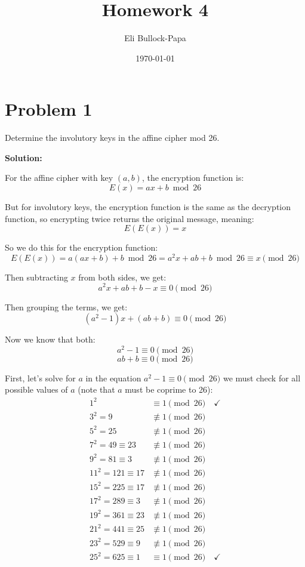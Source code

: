 \documentclass[12pt]{article}
\title{Homework 4}
\author{Eli Bullock-Papa}
\date{\today}
\begin{document}
\maketitle

\section*{Problem 1}
Determine the involutory keys in the affine cipher mod 26.

\vspace{1em}
\textbf{Solution:}

For the affine cipher with key $(a,b)$, the encryption function is:
\[E(x) = ax + b \bmod 26\]

But for involutory keys, the encryption function is the same as the decryption function, so encrypting twice returns the original message, meaning:
\[E(E(x)) = x\]

So we do this for the encryption function:
\[E(E(x)) = a(ax + b) + b \bmod 26 = a^2x + ab + b \bmod 26 \equiv x \pmod{26}\]

Then subtracting $x$ from both sides, we get:
\[a^2x + ab + b - x \equiv 0 \pmod{26}\]

Then grouping the terms, we get:
\[(a^2 - 1)x + (ab + b) \equiv 0 \pmod{26}\]

Now we know that both:
\[a^2 - 1 \equiv 0 \pmod{26}\]
\[ab + b \equiv 0 \pmod{26}\]

First, let's solve for $a$ in the equation $a^2 - 1 \equiv 0 \pmod{26}$ we must check for all possible values of $a$ (note that $a$ must be coprime to 26):
\begin{align*}
1^2 &\equiv 1 \pmod{26} \quad \checkmark\\
3^2 = 9 &\not\equiv 1 \pmod{26}\\
5^2 = 25 &\not\equiv 1 \pmod{26}\\
7^2 = 49 \equiv 23 &\not\equiv 1 \pmod{26}\\
9^2 = 81 \equiv 3 &\not\equiv 1 \pmod{26}\\
11^2 = 121 \equiv 17 &\not\equiv 1 \pmod{26}\\
15^2 = 225 \equiv 17 &\not\equiv 1 \pmod{26}\\
17^2 = 289 \equiv 3 &\not\equiv 1 \pmod{26}\\
19^2 = 361 \equiv 23 &\not\equiv 1 \pmod{26}\\
21^2 = 441 \equiv 25 &\not\equiv 1 \pmod{26}\\
23^2 = 529 \equiv 9 &\not\equiv 1 \pmod{26}\\
25^2 = 625 \equiv 1 &\equiv 1 \pmod{26} \quad \checkmark
\end{align*}
\end{document}
